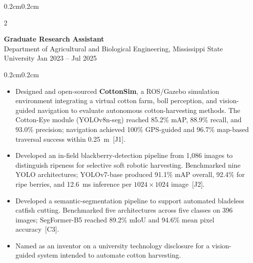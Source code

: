 \documentclass[10pt, letterpaper]{article}
\newenvironment{highlights}{%
    \begin{itemize}[topsep=0.08cm, parsep=0.08cm, partopsep=0pt,
                    itemsep=0pt, leftmargin=0.4cm + 10pt]
}{\end{itemize}}
\newenvironment{onecolentry}{%
    \begin{adjustwidth}{0.2cm}{0.2cm}
}{\end{adjustwidth}}
\newenvironment{twocolentry}[2][]{%
    \onecolentry
    \def\secondColumn{#2}
    \setcolumnwidth{\fill, 4.2cm}
    \begin{paracol}{2}
}{%
    \switchcolumn \raggedleft \secondColumn
    \end{paracol}
    \endonecolentry
}
\begin{document}
\begin{twocolentry}{Jan 2023 -- Jul 2025}
    \textbf{Graduate Research Assistant} \\
    Department of Agricultural and Biological Engineering,
    Mississippi State University
\end{twocolentry}
\begin{onecolentry}
    \begin{highlights}
        \item Designed and open-sourced \textbf{CottonSim}, a ROS/Gazebo
              simulation environment integrating a virtual cotton farm,
              boll perception, and vision-guided navigation to evaluate
              autonomous cotton-harvesting methods. The Cotton-Eye module
              (YOLOv8n-seg) reached 85.2\% mAP, 88.9\% recall, and 93.0\%
              precision; navigation achieved 100\% GPS-guided and 96.7\%
              map-based traversal success within 0.25~m~[J1].

        \item Developed an in-field blackberry-detection pipeline from
              1{,}086 images to distinguish ripeness for selective soft
              robotic harvesting. Benchmarked nine YOLO architectures;
              YOLOv7-base produced 91.1\% mAP overall, 92.4\% for ripe
              berries, and 12.6~ms inference per
              $1024 \times 1024$ image~[J2].

        \item Developed a semantic-segmentation pipeline to support
              automated bladeless catfish cutting. Benchmarked five
              architectures across five classes on 396 images; SegFormer-B5
              reached 89.2\% mIoU and 94.6\% mean pixel accuracy~[C3].

        \item Named as an inventor on a university technology disclosure
              for a vision-guided system intended to automate cotton
              harvesting.
    \end{highlights}
    \vspace{0.12cm}
\end{onecolentry}
\end{document}
